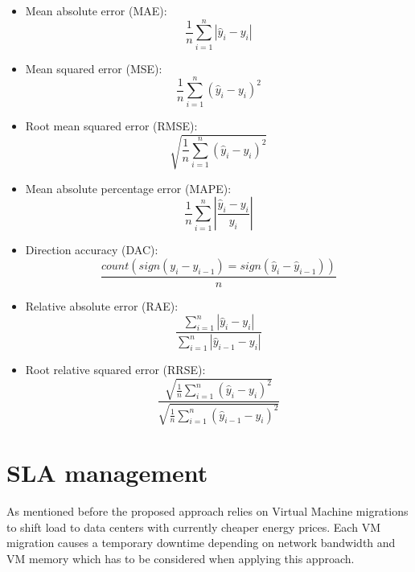 \begin{itemize}

\item Mean absolute error (MAE): \[ \frac{1}{n} \sum_{i=1}^{n} |\hat{y}_i - y_i| \] %

\item Mean squared error (MSE): \[ \frac{1}{n} \sum_{i=1}^{n} (\hat{y}_i - y_i)^2 \] %

\item Root mean squared error (RMSE): \[ \sqrt{\frac{1}{n} \sum_{i=1}^{n} (\hat{y}_i - y_i)^2}\] %

\item Mean absolute percentage error (MAPE): \[ \frac{1}{n} \sum_{i=1}^{n} \left|\frac{\hat{y}_i - y_i}{y_i}\right| \] %

\item Direction accuracy (DAC): \[ \frac{count(sign(y_i - y_{i-1}) = sign(\hat{y}_i - \hat{y}_{i-1}))}{n} \]

\item Relative absolute error (RAE): \[  \frac{ \sum_{i=1}^{n} |\hat{y}_i - y_i|}{ \sum_{i=1}^{n} |\hat{y}_{i-1} - y_i|}   \]

\item Root relative squared error (RRSE): \[  \frac{ \sqrt{ \frac{1}{n} \sum_{i=1}^{n} (\hat{y}_i - y_i)^2 }} { \sqrt{ \frac{1}{n} \sum_{i=1}^{n} (\hat{y}_{i-1} - y_i)^2 }} \]

\end{itemize}








\section{SLA management}

As mentioned before the proposed approach relies on Virtual Machine migrations to shift load to data centers with currently cheaper energy prices. Each VM migration causes a temporary downtime depending on network bandwidth and VM memory \cite{liu2013performance} which has to be considered when applying this approach. 

